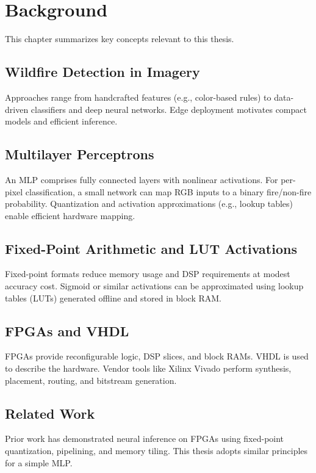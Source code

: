 \chapter{Background}\label{chap:background}
This chapter summarizes key concepts relevant to this thesis.

\section{Wildfire Detection in Imagery}
Approaches range from handcrafted features (e.g., color-based rules) to data-driven classifiers and deep neural networks. Edge deployment motivates compact models and efficient inference.

\section{Multilayer Perceptrons}
An MLP comprises fully connected layers with nonlinear activations. For per-pixel classification, a small network can map RGB inputs to a binary fire/non-fire probability. Quantization and activation approximations (e.g., lookup tables) enable efficient hardware mapping.

\section{Fixed-Point Arithmetic and LUT Activations}
Fixed-point formats reduce memory usage and DSP requirements at modest accuracy cost. Sigmoid or similar activations can be approximated using lookup tables (LUTs) generated offline and stored in block RAM.

\section{FPGAs and VHDL}
FPGAs provide reconfigurable logic, DSP slices, and block RAMs. VHDL is used to describe the hardware. Vendor tools like Xilinx Vivado perform synthesis, placement, routing, and bitstream generation.

\section{Related Work}
Prior work has demonstrated neural inference on FPGAs using fixed-point quantization, pipelining, and memory tiling. This thesis adopts similar principles for a simple MLP.

